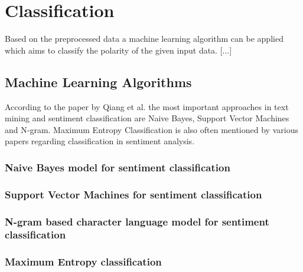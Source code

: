 \section{Classification}
Based on the preprocessed data a machine learning algorithm can be applied which aims to classify the polarity of the given input data. [...]

%

\subsection{Machine Learning Algorithms}
According to the paper by Qiang et al.\autocite{Ye20096527} the most important approaches in 
text mining and sentiment classification are Naive Bayes, Support Vector Machines and 
N-gram. Maximum Entropy Classification is also often mentioned by various papers regarding 
classification in sentiment analysis.

\subsubsection{Naive Bayes model for sentiment classification}

\subsubsection{Support Vector Machines for sentiment classification}

\subsubsection{N-gram based character language model for sentiment classification}

\subsubsection{Maximum Entropy classification}